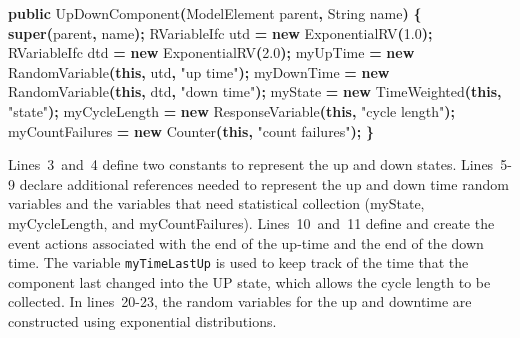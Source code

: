 \documentclass[
]{book}
\newenvironment{Shaded}{\begin{snugshade}}{\end{snugshade}}
\newcommand{\BuiltInTok}[1]{#1}
\newcommand{\FloatTok}[1]{\textcolor[rgb]{0.00,0.00,0.81}{#1}}
\newcommand{\FunctionTok}[1]{\textcolor[rgb]{0.00,0.00,0.00}{#1}}
\newcommand{\KeywordTok}[1]{\textcolor[rgb]{0.13,0.29,0.53}{\textbf{#1}}}
\newcommand{\NormalTok}[1]{#1}
\newcommand{\OperatorTok}[1]{\textcolor[rgb]{0.81,0.36,0.00}{\textbf{#1}}}
\newcommand{\StringTok}[1]{\textcolor[rgb]{0.31,0.60,0.02}{#1}}
\theoremstyle{definition}
\theoremstyle{definition}
\theoremstyle{definition}
\theoremstyle{definition}
\theoremstyle{remark}
\begin{document}
\begin{Shaded}
\begin{Highlighting}[]
    \KeywordTok{public} \FunctionTok{UpDownComponent}\OperatorTok{(}\NormalTok{ModelElement parent}\OperatorTok{,} \BuiltInTok{String}\NormalTok{ name}\OperatorTok{)} \OperatorTok{\{}
        \KeywordTok{super}\OperatorTok{(}\NormalTok{parent}\OperatorTok{,}\NormalTok{ name}\OperatorTok{);}
\NormalTok{        RVariableIfc utd }\OperatorTok{=} \KeywordTok{new} \FunctionTok{ExponentialRV}\OperatorTok{(}\FloatTok{1.0}\OperatorTok{);}
\NormalTok{        RVariableIfc dtd }\OperatorTok{=} \KeywordTok{new} \FunctionTok{ExponentialRV}\OperatorTok{(}\FloatTok{2.0}\OperatorTok{);}
\NormalTok{        myUpTime }\OperatorTok{=} \KeywordTok{new} \FunctionTok{RandomVariable}\OperatorTok{(}\KeywordTok{this}\OperatorTok{,}\NormalTok{ utd}\OperatorTok{,} \StringTok{"up time"}\OperatorTok{);}
\NormalTok{        myDownTime }\OperatorTok{=} \KeywordTok{new} \FunctionTok{RandomVariable}\OperatorTok{(}\KeywordTok{this}\OperatorTok{,}\NormalTok{ dtd}\OperatorTok{,} \StringTok{"down time"}\OperatorTok{);}
\NormalTok{        myState }\OperatorTok{=} \KeywordTok{new} \FunctionTok{TimeWeighted}\OperatorTok{(}\KeywordTok{this}\OperatorTok{,} \StringTok{"state"}\OperatorTok{);}
\NormalTok{        myCycleLength }\OperatorTok{=} \KeywordTok{new} \FunctionTok{ResponseVariable}\OperatorTok{(}\KeywordTok{this}\OperatorTok{,} \StringTok{"cycle length"}\OperatorTok{);}
\NormalTok{        myCountFailures }\OperatorTok{=} \KeywordTok{new} \FunctionTok{Counter}\OperatorTok{(}\KeywordTok{this}\OperatorTok{,} \StringTok{"count failures"}\OperatorTok{);}
    \OperatorTok{\}}
\end{Highlighting}
\end{Shaded}

Lines~3~and~4 define two constants to represent
the up and down states. Lines~5-9 declare additional references
needed to represent the up and down time random variables and the
variables that need statistical collection (myState, myCycleLength, and
myCountFailures). Lines~10~and~11 define and create the event actions
associated with the end of the up-time and the end of the down time. The
variable \texttt{myTimeLastUp} is used to keep track of the time that the
component last changed into the UP state, which allows the cycle length
to be collected. In lines~20-23, the random variables for the up and
downtime are constructed using exponential distributions.
\end{document}
